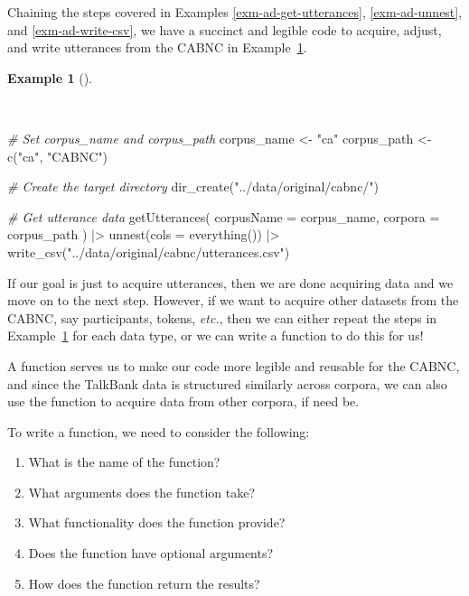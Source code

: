 \documentclass[
  letterpaper,
]{latex/krantz}
\newenvironment{Shaded}{\begin{snugshade}}{\end{snugshade}}
\newcommand{\AttributeTok}[1]{\textcolor[rgb]{0.00,0.00,0.00}{#1}}
\newcommand{\CommentTok}[1]{\textcolor[rgb]{0.00,0.00,0.00}{\textit{#1}}}
\newcommand{\FunctionTok}[1]{\textcolor[rgb]{0.00,0.00,0.00}{#1}}
\newcommand{\NormalTok}[1]{\textcolor[rgb]{0.00,0.00,0.00}{#1}}
\newcommand{\OtherTok}[1]{\textcolor[rgb]{0.00,0.00,0.00}{#1}}
\newcommand{\SpecialCharTok}[1]{\textcolor[rgb]{0.00,0.00,0.00}{#1}}
\newcommand{\StringTok}[1]{\textcolor[rgb]{0.00,0.00,0.00}{#1}}
\providecommand{\tightlist}{%
  \setlength{\itemsep}{0pt}\setlength{\parskip}{0pt}}\usepackage{longtable,booktabs,array}
\theoremstyle{definition}
\newtheorem{example}{Example}[chapter]
\theoremstyle{remark}
\begin{document}
Chaining the steps covered in Examples \ref{exm-ad-get-utterances},
\ref{exm-ad-unnest}, and \ref{exm-ad-write-csv}, we have a succinct and
legible code to acquire, adjust, and write utterances from the CABNC in
Example~\ref{exm-ad-get-unnest-write-csv}.

\begin{example}[]\protect\hypertarget{exm-ad-get-unnest-write-csv}{}\label{exm-ad-get-unnest-write-csv}

~

\begin{Shaded}
\begin{Highlighting}[]
\CommentTok{\# Set corpus\_name and corpus\_path}
\NormalTok{corpus\_name }\OtherTok{\textless{}{-}} \StringTok{"ca"}
\NormalTok{corpus\_path }\OtherTok{\textless{}{-}} \FunctionTok{c}\NormalTok{(}\StringTok{"ca"}\NormalTok{, }\StringTok{"CABNC"}\NormalTok{)}

\CommentTok{\# Create the target directory}
\FunctionTok{dir\_create}\NormalTok{(}\StringTok{"../data/original/cabnc/"}\NormalTok{)}

\CommentTok{\# Get utterance data}
\FunctionTok{getUtterances}\NormalTok{(}
  \AttributeTok{corpusName =}\NormalTok{ corpus\_name,}
  \AttributeTok{corpora =}\NormalTok{ corpus\_path}
\NormalTok{) }\SpecialCharTok{|\textgreater{}}
  \FunctionTok{unnest}\NormalTok{(}\AttributeTok{cols =} \FunctionTok{everything}\NormalTok{()) }\SpecialCharTok{|\textgreater{}}
  \FunctionTok{write\_csv}\NormalTok{(}\StringTok{"../data/original/cabnc/utterances.csv"}\NormalTok{)}
\end{Highlighting}
\end{Shaded}

\end{example}

If our goal is just to acquire utterances, then we are done acquiring
data and we move on to the next step. However, if we want to acquire
other datasets from the CABNC, say participants, tokens, \emph{etc.},
then we can either repeat the steps in
Example~\ref{exm-ad-get-unnest-write-csv} for each data type, or we can
write a function to do this for us!

A function serves us to make our code more legible and reusable for the
CABNC, and since the TalkBank data is structured similarly across
corpora, we can also use the function to acquire data from other
corpora, if need be.

To write a function, we need to consider the following:

\begin{enumerate}
\def\labelenumi{\arabic{enumi}.}
\tightlist
\item
  What is the name of the function?
\item
  What arguments does the function take?
\item
  What functionality does the function provide?
\item
  Does the function have optional arguments?
\item
  How does the function return the results?
\end{enumerate}
\end{document}
